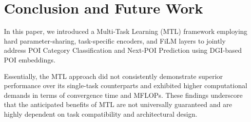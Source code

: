 \section{Conclusion and Future Work}
\label{sec:conclusion}

In this paper, we introduced a Multi-Task Learning (MTL) framework employing hard parameter-sharing, task-specific encoders, and FiLM layers to jointly address POI Category Classification and Next-POI Prediction using DGI-based POI embeddings.

Essentially, the MTL approach did not consistently demonstrate superior performance over its single-task counterparts and exhibited higher computational demands in terms of convergence time and MFLOPs. These findings underscore that the anticipated benefits of MTL are not universally guaranteed and are highly dependent on task compatibility and architectural design.

